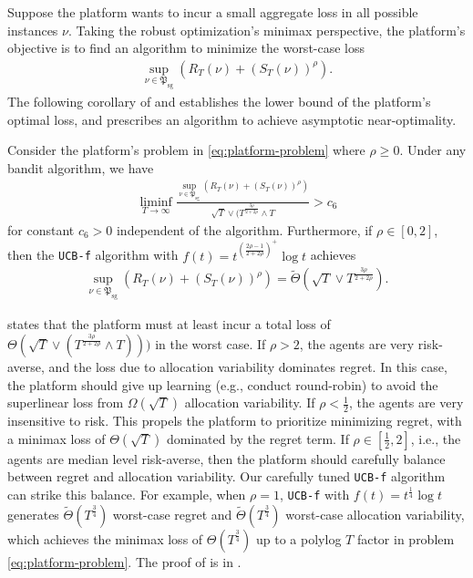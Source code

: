 \documentclass[nonblindrev]{informs3_noinforms}
\begin{document}
{Suppose the platform wants to incur a small aggregate loss in all possible instances $\nu$. Taking the robust optimization's minimax perspective, the platform's objective is to find an algorithm to minimize the worst-case loss 
\begin{align}\label{eq:platform-problem}
    \sup_{\nu\in\mathfrak{P}_{\mathrm{sg}}}\left(R_T(\nu)+(S_T(\nu))^\rho\right).
\end{align}
The following corollary of  and  establishes the lower bound of the platform's optimal loss, and prescribes an algorithm to achieve asymptotic near-optimality.
\begin{corollary}\label{cor:platform-value-lower-bound}
Consider the platform's problem in \eqref{eq:platform-problem} where $\rho\geq 0$. Under any bandit algorithm, we have
    \begin{align*}
        \liminf_{T\rightarrow\infty}\frac{\sup_{\nu\in\mathfrak{P}_{\mathrm{sg}}}\left(R_T(\nu)+(S_T(\nu))^\rho\right)}{\sqrt T\vee (T^{\frac{3\rho}{2+2\rho}}\wedge T}>c_6
    \end{align*}
    for constant $c_6>0$ independent of the algorithm. Furthermore, if $\rho\in[0,2]$, then the \texttt{UCB-f} algorithm with $f(t)=t^{\left(\frac{2\rho-1}{2+2\rho}\right)^+}\log t$ achieves
    \begin{align*}
        \sup_{\nu\in\mathfrak{P}_{\mathrm{sg}}}(R_T(\nu)+(S_T(\nu))^\rho)=\tilde\Theta(\sqrt T\vee T^\frac{3\rho}{2+2\rho}).
    \end{align*}
\end{corollary}
 states that the platform must at least incur a total loss of $\Theta\left(\sqrt T\vee \left(T^{\frac{3\rho}{2+2\rho}}\wedge T\right)\right))$ in the worst case. If $\rho>2$, the agents are very risk-averse, and the loss due to allocation variability dominates regret. In this case, the platform should give up learning (e.g., conduct round-robin) to avoid the superlinear loss from $\Omega(\sqrt T)$ allocation variability. If $\rho<\frac{1}{2}$, the agents are very insensitive to risk. This propels the platform to prioritize minimizing regret, with a minimax loss of $\Theta(\sqrt T)$ dominated by the regret term. If $\rho\in[\frac{1}{2},2]$, i.e., the agents are median level risk-averse, then the platform should carefully balance between regret and allocation variability. Our carefully tuned \texttt{UCB-f} algorithm can strike this balance. For example, when $\rho=1$, \texttt{UCB-f} with $f(t)=t^{\frac{1}{4}}\log t$ generates $\tilde \Theta(T^{\frac{3}{4}})$ worst-case regret and $\tilde \Theta(T^{\frac{3}{4}})$ worst-case allocation variability, which achieves the minimax loss of $\Theta(T^\frac{3}{4})$ up to a polylog $T$ factor in problem \eqref{eq:platform-problem}. The proof of  is in .
}
\end{document}

